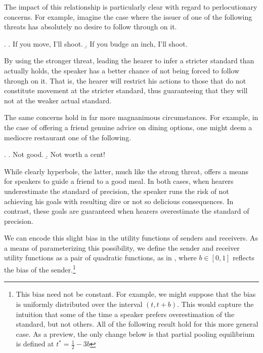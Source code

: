 \documentclass[12pt]{article}
\theoremstyle{definition} \newtheorem{definition}{Definition}
\begin{document}
The impact of this relationship is particularly clear with regard to perlocutionary concerns. For example, imagine the case where the issuer of one of the following threats has absolutely no desire to follow through on it.

  \ex. \a. If you move, I'll shoot.
       \b. If you budge an inch, I'll shoot.

By using the stronger threat, leading the hearer to infer a stricter standard than actually holds, the speaker has a better chance of not being forced to follow through on it. That is, the hearer will restrict his actions to those that do not constitute movement at the stricter standard, thus guaranteeing that they will not at the weaker actual standard. 

The same concerns hold in far more magnanimous circumstances. For example, in the case of offering a friend genuine advice on dining options, one might deem a mediocre restaurant one of the following.

 \ex. \a. Not good.
      \b. Not worth a cent!

While clearly hyperbole, the latter, much like the strong threat, offers a means for speakers to guide a friend to a good meal. In both cases, when hearers underestimate the standard of precision, the speaker runs the risk of not achieving his goals with resulting dire or not so delicious consequences. In contrast, these goals are guaranteed when hearers overestimate the standard of precision.

We can encode this slight bias in the utility functions of senders and receivers. As a means of parameterizing this possibility, we define the sender and receiver utility functions as a pair of quadratic functions, as in \cite{crawford-sobel:1982}, where $b \in [0,1]$ reflects the bias of the sender.\footnote{This bias need not be constant. For example, we might suppose that the bias is uniformly distributed over the interval $(t,t+b)$. This would capture the intuition that some of the time a speaker prefers overestimation of the standard, but not others. All of the following result hold for this more general case. As a preview, the only change below is that partial pooling equilibrium is defined at $t^* = \frac{1}{2} - 3b$ }
\end{document}
